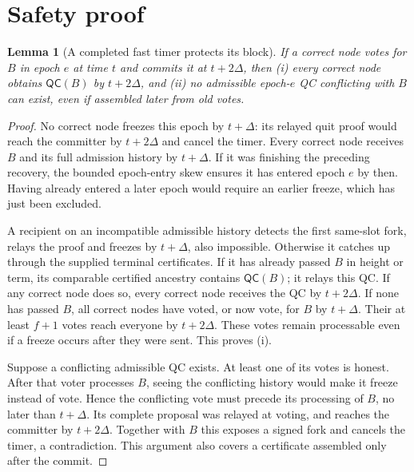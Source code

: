 \documentclass[10pt,a4paper]{article}
\newcommand{\QC}{\mathsf{QC}}
\newtheorem{lemma}{Lemma}
\begin{document}
\section*{Safety proof}
\begin{lemma}[A completed fast timer protects its block]\label{lem:timer}
If a correct node votes for $B$ in epoch $e$ at time $t$ and commits it at
$t+2\Delta$, then (i) every correct node obtains $\QC(B)$ by $t+2\Delta$,
and (ii) no admissible epoch-$e$ QC conflicting with $B$ can exist, even if
assembled later from old votes.
\end{lemma}
\begin{proof}
No correct node freezes this epoch by $t+\Delta$: its relayed quit proof
would reach the committer by $t+2\Delta$ and cancel the timer. Every correct
node receives $B$ and its full admission history by $t+\Delta$. If it was
finishing the preceding recovery, the bounded epoch-entry skew ensures it
has entered epoch $e$ by then. Having already entered a later epoch would
require an earlier freeze, which has just been excluded.

A recipient on an incompatible admissible history detects the first
same-slot fork, relays the proof and freezes by $t+\Delta$, also impossible.
Otherwise it catches up through the supplied terminal certificates. If it
has already passed $B$ in height or term, its comparable certified ancestry
contains $\QC(B)$; it relays this QC. If any correct node does so, every
correct node receives the QC by $t+2\Delta$. If none has passed $B$, all
correct nodes have voted, or now vote, for $B$ by $t+\Delta$. Their at least
$f+1$ votes reach everyone by $t+2\Delta$. These votes remain processable
even if a freeze occurs after they were sent. This proves (i).

Suppose a conflicting admissible QC exists. At least one of its votes is
honest. After that voter processes $B$, seeing the conflicting history would
make it freeze instead of vote. Hence the conflicting vote must precede
its processing of $B$, no later than $t+\Delta$. Its complete proposal was
relayed at voting, and reaches the committer by $t+2\Delta$. Together with
$B$ this exposes a signed fork and cancels the timer, a contradiction.
This argument also covers a certificate assembled only after the commit.
\end{proof}
\end{document}
